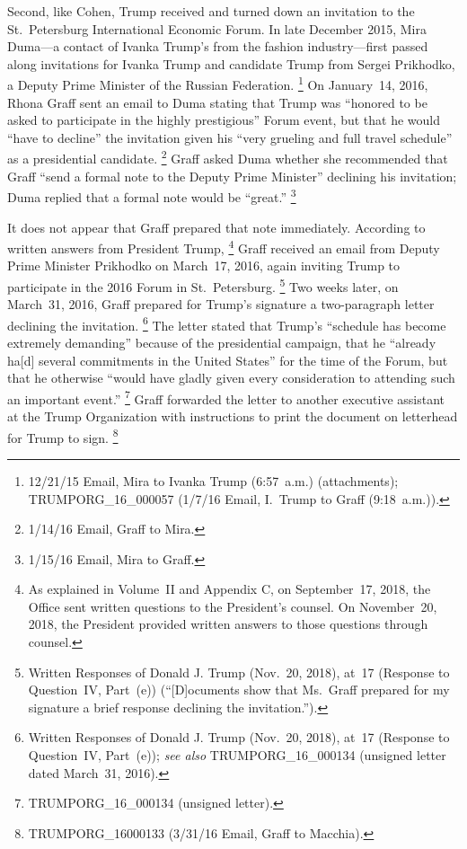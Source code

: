 Second, like Cohen, Trump received and turned down an invitation to the St.~Petersburg International Economic Forum.
In late December 2015, Mira Duma---a contact of Ivanka Trump's from the fashion industry---first passed along invitations for Ivanka Trump and candidate Trump from Sergei Prikhodko, a Deputy Prime Minister of the Russian Federation.%
\footnote{12/21/15 Email, Mira to Ivanka Trump (6:57~a.m.) (attachments);
TRUMPORG\_16\_000057 (1/7/16 Email, I.~Trump to Graff (9:18~a.m.)).}
On January~14, 2016, Rhona Graff sent an email to Duma stating that Trump was ``honored to be asked to participate in the highly prestigious'' Forum event, but that he would ``have to decline'' the invitation given his ``very grueling and full travel schedule'' as a presidential candidate.%
\footnote{1/14/16 Email, Graff to Mira.}
Graff asked Duma whether she recommended that Graff ``send a formal note to the Deputy Prime Minister'' declining his invitation; Duma replied that a formal note would be ``great.''%
\footnote{1/15/16 Email, Mira to Graff.}

It does not appear that Graff prepared that note immediately.
According to written answers from President Trump,%
\footnote{As explained in Volume~II and Appendix C, on September~17, 2018, the Office sent written questions to the President's counsel.
On November~20, 2018, the President provided written answers to those questions through counsel.}
Graff received an email from Deputy Prime Minister Prikhodko on March~17, 2016, again inviting Trump to participate in the 2016 Forum in St.~Petersburg.%
\footnote{Written Responses of Donald J. Trump (Nov.~20, 2018), at~17 (Response to Question~IV, Part~(e)) (``[D]ocuments show that Ms.~Graff prepared for my signature a brief response declining the invitation.'').}
Two weeks later, on March~31, 2016, Graff prepared for Trump's signature a two-paragraph letter declining the invitation.%
\footnote{Written Responses of Donald J. Trump (Nov.~20, 2018), at~17 (Response to Question~IV, Part~(e));
\textit{see also} TRUMPORG\_16\_000134 (unsigned letter dated March~31, 2016).}
The letter stated that Trump's ``schedule has become extremely demanding'' because of the presidential campaign, that he ``already ha[d] several commitments in the United States'' for the time of the Forum, but that he otherwise ``would have gladly given every consideration to attending such an important event.''%
\footnote{TRUMPORG\_16\_000134 (unsigned letter).}
Graff forwarded the letter to another executive assistant at the Trump Organization with instructions to print the document on letterhead for Trump to sign.%
\footnote{TRUMPORG\_16000133 (3/31/16 Email, Graff to Macchia).}

